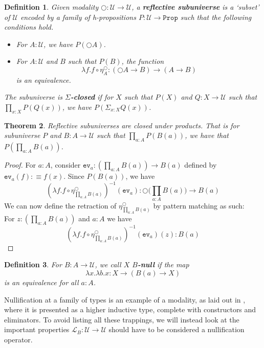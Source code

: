\documentclass[12pt]{report}
\newtheorem{thm}{Theorem}[section]
\newtheorem{defn}[thm]{Definition}
\begin{document}
\begin{defn}
Given modality $\bigcirc : \mathcal{U} \rightarrow \mathcal{U}$, a \textbf{reflective subuniverse} is a `subset' of $\mathcal{U}$ encoded by a family of h-propositions $P : \mathcal{U} \rightarrow \mathtt{Prop}$ such that the following conditions hold. 
\begin{itemize}
	\item For $A : \mathcal{U}$, we have $P(\bigcirc A)$.
	\item For $A : \mathcal{U}$ and $B$ such that $P(B)$, the function
	$$\lambda f.f \circ \eta_A^\bigcirc : (\bigcirc A \rightarrow B) \rightarrow (A \rightarrow B)$$
	is an equivalence.

\end{itemize}
The subuniverse is $\Sigma$\textbf{-closed} if for $X$ such that $P(X)$ and $Q : X \rightarrow \mathcal{U}$ such that $\prod_{x : X} P(Q(x))$, we have $P(\Sigma_{x : X} Q(x))$.
\end{defn}

\begin{thm}
Reflective subuniverses are closed under products. 
That is for subuniverse $P$ and $B : A \rightarrow \mathcal{U}$ such that $\prod_{a : A}P(B(a))$, we have that $P(\prod_{a : A} B(a))$. 
\end{thm}

\begin{proof}
For $a : A$, consider $\mathtt{ev}_a: (\prod_{a: A}B(a)) \rightarrow B(a)$ defined by $\mathtt{ev}_a (f) : \equiv f(x)$. 
Since $P(B(a))$, we have 
$$(\lambda f.f \circ \eta_{\prod_{a: A}B(a)}^\bigcirc)^{-1} (\mathtt{ev}_a) : \bigcirc\big(\prod_{a: A}B(a)\big) \rightarrow B(a)$$
We can now define the retraction of $\eta^\bigcirc_{\prod_{a : A} B(a)}$ by pattern matching as such:\\
For $z: (\prod_{a: A}B(a))$ and $a : A$ we have 
$$(\lambda f.f \circ \eta_{\prod_{a: A}B(a)}^\bigcirc)^{-1} (\mathtt{ev}_a) (z) : B(a)$$

\end{proof}

\begin{defn}
For $B : A \rightarrow \mathcal{U}$, we call $X$ $B$\textbf{-null} if the map 
$$\lambda x. \lambda b.x : X \rightarrow (B(a) \rightarrow X)$$
is an equivalence for all $a : A$.

\end{defn}

Nullification at a family of types is an example of a modality, as laid out in \cite{1706.07526}, where it is presented as a higher inductive type, complete with constructors and eliminators. 
To avoid listing all these trappings, we will instead look at the important properties $\mathcal{L}_B : \mathcal{U} \rightarrow \mathcal{U}$ should have to be considered a nullification operator. 
\end{document}
